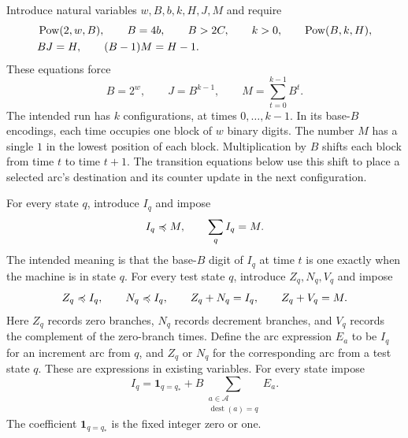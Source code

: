 Introduce natural variables $w,B,b,k,H,J,M$ and require
\begin{align}
 &\operatorname{Pow}(2,w,B),\qquad B=4b,\qquad B>2C,\qquad k>0,
       \qquad\operatorname{Pow}(B,k,H),\label{eq:machine-base}\\
 &BJ=H,\qquad (B-1)M=H-1.\label{eq:machine-geometric}
\end{align}
These equations force
\begin{equation}\label{eq:machine-JM}
 B=2^w,\qquad J=B^{k-1},\qquad M=\sum_{t=0}^{k-1}B^t.
\end{equation}
The intended run has $k$ configurations, at times $0,\ldots,k-1$.
In its base-$B$ encodings, each time occupies one block of $w$ binary
digits. The number $M$ has a single $1$ in the lowest position of each
block.
Multiplication by $B$ shifts each block from time $t$ to time $t+1$.
The transition equations below use this shift to place a selected arc's
destination and its counter update in the next configuration.

For every state $q$, introduce $I_q$ and impose
\begin{equation}\label{eq:machine-state-partition}
 I_q\preccurlyeq M,\qquad \sum_q I_q=M.
\end{equation}
The intended meaning is that the base-$B$ digit of $I_q$ at time $t$
is one exactly when the machine is in state $q$. For every test state
$q$, introduce $Z_q,N_q,V_q$ and impose
\begin{equation}\label{eq:machine-test-partition}
 Z_q\preccurlyeq I_q,\qquad N_q\preccurlyeq I_q,\qquad
 Z_q+N_q=I_q,\qquad Z_q+V_q=M.
\end{equation}
Here $Z_q$ records zero branches, $N_q$ records decrement branches, and
$V_q$ records the complement of the zero-branch times.
Define the arc expression $E_a$ to be $I_q$ for an increment arc from
$q$, and $Z_q$ or $N_q$ for the corresponding arc from a test state $q$.
These are expressions in existing variables. For every state impose
\begin{equation}\label{eq:machine-state-transition}
 I_q=\mathbf 1_{q=q_*}
       +B\sum_{\substack{a\in\mathcal A\\\operatorname{dest}(a)=q}}E_a.
\end{equation}
The coefficient $\mathbf 1_{q=q_*}$ is the fixed integer zero or one.

